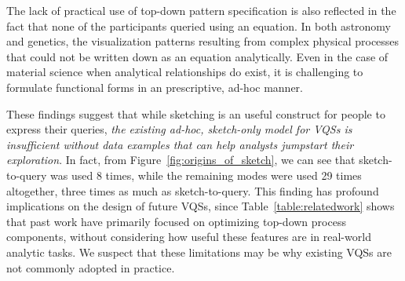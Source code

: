 \par The lack of practical use of top-down pattern 
specification is also reflected in the fact 
that none of the participants queried using an equation. 
In both astronomy and genetics, the visualization patterns 
resulting from complex physical processes 
that could not be written down as an equation analytically. 
Even in the case of material science when analytical 
relationships do exist, it is challenging to formulate 
functional forms in an prescriptive, ad-hoc manner.
\par These findings suggest that while sketching 
is an useful construct for people to express their queries, 
\emph{the existing ad-hoc, sketch-only model for VQSs 
is insufficient without data examples 
that can help analysts jumpstart their exploration}. 
In fact, from Figure~\ref{fig:origins_of_sketch},
we can see that sketch-to-query was used 
8 times, while the remaining modes were used 29 times altogether,
three times as much as sketch-to-query.
This finding has profound implications 
on the design of future VQSs, since Table~\ref{table:relatedwork} 
shows that past work have primarily focused 
on optimizing top-down process components, 
without considering how useful these features 
are in real-world analytic tasks.
We suspect that these limitations 
may be why existing VQSs are not commonly adopted in practice. %

